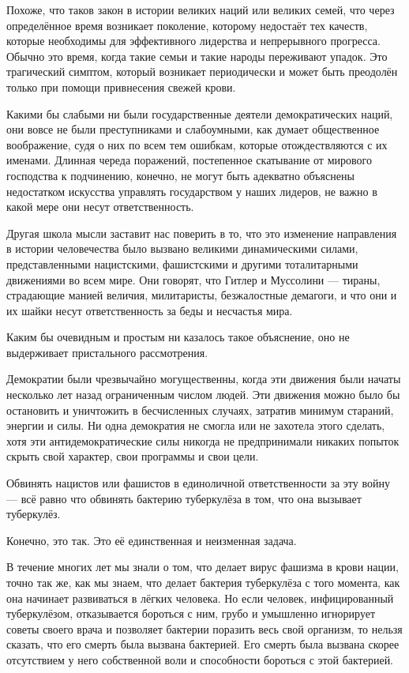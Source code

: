 Похоже, что таков закон в истории великих наций или великих семей, что через определённое время возникает поколение, которому недостаёт тех качеств, которые необходимы для эффективного лидерства и непрерывного прогресса. Обычно это время, когда такие семьи и такие народы переживают упадок. Это трагический симптом, который возникает периодически и может быть преодолён только при помощи привнесения свежей крови.

Какими бы слабыми ни были государственные деятели демократических наций, они вовсе не были преступниками и слабоумными, как думает общественное воображение, судя о них по всем тем ошибкам, которые отождествляются с их именами. Длинная череда поражений, постепенное скатывание от мирового господства к подчинению, конечно, не могут быть адекватно объяснены недостатком искусства управлять государством у наших лидеров, не важно в какой мере они несут ответственность.

Другая школа мысли заставит нас поверить в то, что это изменение направления в истории человечества было вызвано великими динамическими силами, представленными нацистскими, фашистскими и другими тоталитарными движениями во всем мире. Они говорят, что Гитлер и Муссолини — тираны, страдающие манией величия, милитаристы, безжалостные демагоги, и что они и их шайки несут ответственность за беды и несчастья мира.

Каким бы очевидным и простым ни казалось такое объяснение, оно не выдерживает пристального рассмотрения.

Демократии были чрезвычайно могущественны, когда эти движения были начаты несколько лет назад ограниченным числом людей. Эти движения можно было бы остановить и уничтожить в бесчисленных случаях, затратив минимум стараний, энергии и силы. Ни одна демократия не смогла или не захотела этого сделать, хотя эти антидемократические силы никогда не предпринимали никаких попыток скрыть свой характер, свои программы и свои цели.

Обвинять нацистов или фашистов в единоличной ответственности за эту войну — всё равно что обвинять бактерию туберкулёза в том, что она вызывает туберкулёз.

Конечно, это так. Это её единственная и неизменная задача.

В течение многих лет мы знали о том, что делает вирус фашизма в крови нации, точно так же, как мы знаем, что делает бактерия туберкулёза с того момента, как она начинает развиваться в лёгких человека. Но если человек, инфицированный туберкулёзом, отказывается бороться с ним, грубо и умышленно игнорирует советы своего врача и позволяет бактерии поразить весь свой организм, то нельзя сказать, что его смерть была вызвана бактерией. Его смерть была вызвана скорее отсутствием у него собственной воли и способности бороться с этой бактерией.

